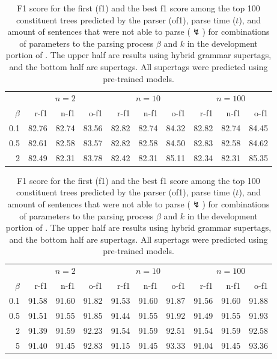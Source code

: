 \documentclass[../../document.tex]{subfiles}
\begin{document}
    \begin{table}
        \caption{\label{tbl:grid:reranking:supervised}
        F1 score for the first (f1) and the best f1 score among the top 100 constituent trees predicted by the parser (of1), parse time ($t$), and amount of sentences that were not able to parse ($\lightning$) for combinations of parameters to the parsing process $\beta$ and $k$ in the development portion of \negra{}. The upper half are results using hybrid grammar supertags, and the bottom half are  supertags. All supertags were predicted using pre-trained models.
        }
        \centering
        \vspace{.2cm}
        \begin{tabular}{r|rrr|rrr|rrr}
            \toprule
       & \multicolumn{3}{c|}{$n = 2$} & \multicolumn{3}{c|}{$n = 10$}& \multicolumn{3}{c}{$n = 100$}\\
 \(\beta\) & r-f1 & n-f1 & o-f1  & r-f1 & n-f1 & o-f1 & r-f1 & n-f1 & o-f1   \\
\hline 
0.1 & 82.76 & 82.74 & 83.56 & 82.82 & 82.74 & 84.32 & 82.82 & 82.74 & 84.45 \\
0.5 & 82.61 & 82.58 & 83.57 & 82.82 & 82.58 & 84.50 & 82.83 & 82.58 & 84.62 \\
  2 & 82.49 & 82.31 & 83.78 & 82.42 & 82.31 & 85.11 & 82.34 & 82.31 & 85.35 \\
\bottomrule
        \end{tabular}
    \end{table}

    \begin{table}
        \caption{\label{tbl:grid:reranking:pretrained}
        F1 score for the first (f1) and the best f1 score among the top 100 constituent trees predicted by the parser (of1), parse time ($t$), and amount of sentences that were not able to parse ($\lightning$) for combinations of parameters to the parsing process $\beta$ and $k$ in the development portion of \negra{}. The upper half are results using hybrid grammar supertags, and the bottom half are  supertags. All supertags were predicted using pre-trained models.
        }
        \centering
        \vspace{.2cm}
        \begin{tabular}{r|rrr|rrr|rrr}
            \toprule
       & \multicolumn{3}{c|}{$n = 2$} & \multicolumn{3}{c|}{$n = 10$}& \multicolumn{3}{c}{$n = 100$}\\
 \(\beta\) & r-f1 & n-f1 & o-f1  & r-f1 & n-f1 & o-f1 & r-f1 & n-f1 & o-f1   \\
\hline 
0.1 & 91.58 & 91.60 & 91.82 & 91.53 & 91.60 & 91.87 & 91.56 & 91.60 & 91.88\\
0.5 & 91.51 & 91.55 & 91.85 & 91.44 & 91.55 & 91.92 & 91.49 & 91.55 & 91.93 \\
  2 & 91.39 & 91.59 & 92.23 & 91.54 & 91.59 & 92.51 & 91.54 & 91.59 & 92.58 \\
  5 & 91.40 & 91.45 & 92.83 & 91.15 & 91.45 & 93.33 & 91.04 & 91.45 & 93.36 \\
\bottomrule
        \end{tabular}
    \end{table}
\end{document}
